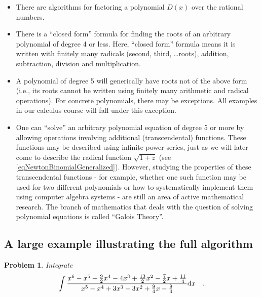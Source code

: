 \documentclass[12pt]{book}
\newtheorem{problem}[theorem]{Problem}
\begin{document}
\begin{itemize}
\item There are algorithms for factoring a polynomial $D(x)$ over the rational numbers.
\item There is a ``closed form'' formula for finding the roots of an arbitrary polynomial of degree 4 or less. Here, ``closed form'' formula means it is written with finitely many radicals (second, third, \dots roots), addition, subtraction, division and multiplication.
\item A polynomial of degree 5 will generically have roots not of the above form (i.e., its roots cannot be written using finitely many arithmetic and radical operations). For concrete polynomials, there may be exceptions. All examples in our calculus course will fall under this exception.
\item One can ``solve'' an arbitrary polynomial equation of degree 5 or more by allowing operations involving additional (transcendental) functions. These functions may be described using infinite power series, just as we will later come to describe the radical function $\sqrt{1+z}$ (see \eqref{eqNewtonBinomialGeneralized}). However, studying the properties of these transcendental functions - for example, whether one such function may be used for two different polynomials or how to systematically implement them using computer algebra systems - are still an area of active mathematical research. The branch of mathematics that deals with the question of solving polynomial equations is called ``Galois Theory''.
\end{itemize}

\subsection{A large example illustrating the full algorithm }
\begin{problem}
Integrate
\[
\int \frac{x^{6}-x^{5}+\frac{9}{2} x^{4}-4 x^{3}+\frac{13}{2} x^{2}-\frac{7}{2} x+\frac{11}{4}}{x^{5}-x^{4}+3 x^{3}-3 x^{2}+\frac{9}{4} x-\frac{9}{4}} {\normalfont \text{d}} x\quad .
\]
\end{problem}
\end{document}

